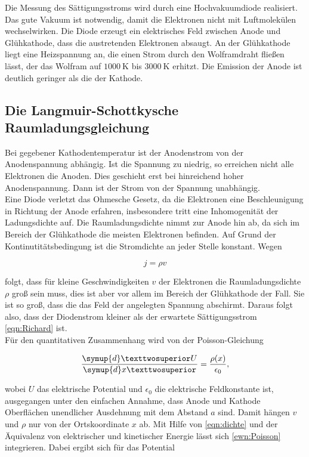 Die Messung des Sättigungsstroms wird durch eine Hochvakuumdiode realisiert. Das
gute Vakuum ist notwendig, damit die Elektronen nicht mit Luftmolekülen wechselwirken.
Die Diode erzeugt ein elektrisches Feld zwischen Anode und Glühkathode, dass die
austretenden Elektronen absaugt. An der Glühkathode liegt eine Heizspannung an, die
einen Strom durch den Wolframdraht fließen lässt, der das Wolfram auf $\SI{1000}{\kelvin}$
bis $\SI{3000}{\kelvin}$ erhitzt. Die Emission der Anode ist deutlich geringer
als die der Kathode. 

\subsection{Die Langmuir-Schottkysche Raumladungsgleichung}

Bei gegebener Kathodentemperatur ist der Anodenstrom von der Anodenspannung 
abhängig. Ist die Spannung zu niedrig, so erreichen nicht alle Elektronen
die Anoden. Dies geschieht erst bei hinreichend hoher Anodenspannung. Dann ist 
der Strom von der Spannung unabhängig. \\
Eine Diode verletzt das Ohmesche Gesetz, da die Elektronen eine Beschleunigung 
in Richtung der Anode erfahren, insbesondere tritt eine Inhomogenität der 
Ladungsdichte auf. Die Raumladungsdichte nimmt zur Anode hin ab, da sich im 
Bereich der Glühkathode die meisten Elektronen befinden. Auf Grund der 
Kontinutitätsbedingung ist die Stromdichte an jeder Stelle konstant. Wegen

\begin{equation}
j = \rho v
\label{eqn:dichte}
\end{equation}

folgt, dass für kleine Geschwindigkeiten $v$ der Elektronen die Raumladungsdichte
$\rho$ groß sein muss, dies ist aber vor allem im Bereich der Glühkathode der Fall.
Sie ist so groß, dass die das Feld der angelegten Spannung abschirmt. Daraus 
folgt also, dass der Diodenstrom kleiner als der erwartete Sättigungsstrom 
\eqref{eqn:Richard} ist. \\
Für den quantitativen Zusammenhang wird von der Poisson-Gleichung 

\begin{equation}
\frac{\symup{d}²U}{\symup{d}x²} = \frac{\rho(x)}{\epsilon_0},
\label{eqn:Poisson}
\end{equation}

wobei $U$ das elektrische Potential und $\epsilon_0$ die elektrische 
Feldkonstante ist, ausgegangen unter den einfachen Annahme, dass Anode und
Kathode Oberflächen unendlicher Ausdehnung mit dem Abstand $a$ sind. Damit 
hängen $v$ und $\rho$ nur von der Ortskoordinate $x$ ab. Mit Hilfe von 
\eqref{eqn:dichte} und der Äquivalenz von elektrischer und kinetischer 
Energie lässt sich \eqref{ewn:Poisson} integrieren. Dabei ergibt sich 
für das Potential 

